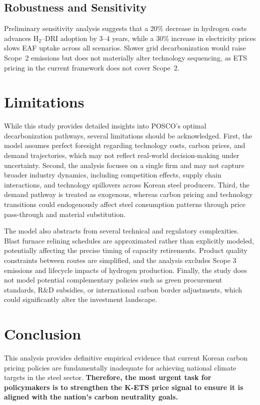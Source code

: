 \documentclass[preprint,5p,authoryear]{elsarticle}
\begin{document}
\subsection{Robustness and Sensitivity}
Preliminary sensitivity analysis suggests that a 20\% decrease in hydrogen costs advances H$_2$--DRI adoption by 3--4 years, while a 30\% increase in electricity prices slows EAF uptake across all scenarios. Slower grid decarbonization would raise Scope~2 emissions but does not materially alter technology sequencing, as ETS pricing in the current framework does not cover Scope~2.

\section{Limitations}

While this study provides detailed insights into POSCO's optimal decarbonization pathways, several limitations should be acknowledged. First, the model assumes perfect foresight regarding technology costs, carbon prices, and demand trajectories, which may not reflect real-world decision-making under uncertainty. Second, the analysis focuses on a single firm and may not capture broader industry dynamics, including competition effects, supply chain interactions, and technology spillovers across Korean steel producers. Third, the demand pathway is treated as exogenous, whereas carbon pricing and technology transitions could endogenously affect steel consumption patterns through price pass-through and material substitution.

The model also abstracts from several technical and regulatory complexities. Blast furnace relining schedules are approximated rather than explicitly modeled, potentially affecting the precise timing of capacity retirements. Product quality constraints between routes are simplified, and the analysis excludes Scope 3 emissions and lifecycle impacts of hydrogen production. Finally, the study does not model potential complementary policies such as green procurement standards, R\&D subsidies, or international carbon border adjustments, which could significantly alter the investment landscape.

\section{Conclusion}

This analysis provides definitive empirical evidence that current Korean carbon pricing policies are fundamentally inadequate for achieving national climate targets in the steel sector. \textbf{Therefore, the most urgent task for policymakers is to strengthen the K-ETS price signal to ensure it is aligned with the nation's carbon neutrality goals.}
\end{document}
